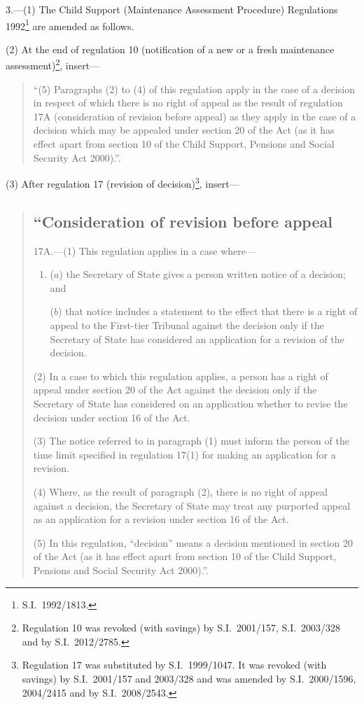 \documentclass[12pt,a4paper]{article}
\begin{document}
3.---(1)  The Child Support (Maintenance Assessment Procedure) Regulations 1992\footnote{S.I.~1992/1813.} are amended as follows.

(2) At the end of regulation 10 (notification of a new or a fresh maintenance assessment)\footnote{Regulation 10 was revoked (with savings) by S.I.~2001/157, S.I.~2003/328 and by S.I.~2012/2785.}, insert—
\begin{quotation}
“(5) Paragraphs (2) to (4) of this regulation apply in the case of a decision in respect of which there is no right of appeal as the result of regulation 17A (consideration of revision before appeal) as they apply in the case of a decision which may be appealed under section 20 of the Act (as it has effect apart from section 10 of the Child Support, Pensions and Social Security Act 2000).”.
\end{quotation}

(3) After regulation 17 (revision of decision)\footnote{Regulation 17 was substituted by S.I.~1999/1047. It was revoked (with savings) by S.I.~2001/157 and 2003/328 and was amended by S.I.~2000/1596, 2004/2415 and by S.I.~2008/2543.}, insert—
\begin{quotation}
\subsection*{“Consideration of revision before appeal}

17A.---(1)  This regulation applies in a case where—
\begin{enumerate}\item[]
($a$) the Secretary of State gives a person written notice of a decision; and

($b$) that notice includes a statement to the effect that there is a right of appeal to the First-tier Tribunal against the decision only if the Secretary of State has considered an application for a revision of the decision.
\end{enumerate}

(2) In a case to which this regulation applies, a person has a right of appeal under section 20 of the Act against the decision only if the Secretary of State has considered on an application whether to revise the decision under section 16 of the Act.

(3) The notice referred to in paragraph (1) must inform the person of the time limit specified in regulation 17(1) for making an application for a revision.

(4) Where, as the result of paragraph (2), there is no right of appeal against a decision, the Secretary of State may treat any purported appeal as an application for a revision under section 16 of the Act.

(5) In this regulation, “decision” means a decision mentioned in section 20 of the Act (as it has effect apart from section 10 of the Child Support, Pensions and Social Security Act 2000).”.
\end{quotation}
\end{document}
